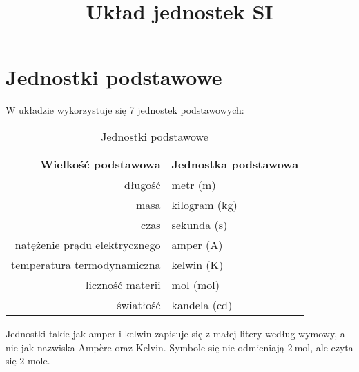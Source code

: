 \documentclass{article}
\title{Układ jednostek SI}
\date{}
\begin{document}
\maketitle
\section{Jednostki podstawowe}
W układzie wykorzystuje się 7 jednostek podstawowych:
\begin{table}[H]
\centering
\begin{tabular}{rl}
\toprule
Wielkość podstawowa & Jednostka podstawowa \\
\midrule
długość & metr (\unit{\m}) \\
masa & kilogram (\unit{\kg}) \\
czas & sekunda (\unit{\s}) \\
natężenie prądu elektrycznego & amper (\unit{\A}) \\
temperatura termodynamiczna & kelwin (\unit{\K}) \\
liczność materii & mol (\unit{\mol}) \\
światłość & kandela (\unit{\candela}) \\
\bottomrule
\end{tabular}
\caption{Jednostki podstawowe}
\end{table}
Jednostki takie jak amper i kelwin zapisuje się z małej litery według wymowy, a nie jak nazwiska Amp\`{e}re oraz Kelvin. Symbole się nie odmieniają $\qty{2}{\mol}$, ale czyta się $2$ mole. \par
\end{document}
